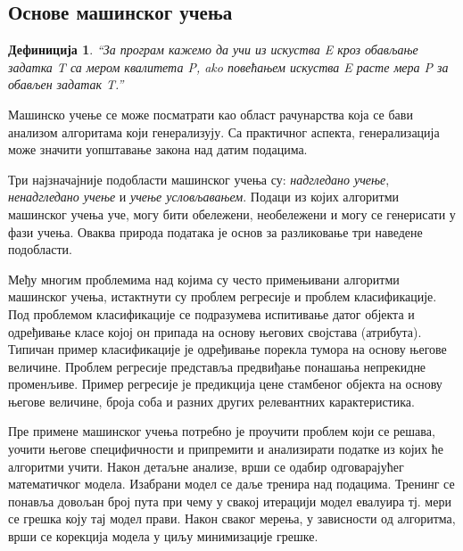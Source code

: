 \documentclass[a4paper]{article}
\newtheorem{definic}{Дефиниција}
\begin{document}
{\subsection{Основе машинског учења}
\begin{definic}
``За програм кажемо да учи из искуства E кроз обављање задатка T са мером квалитета P, ako повећањем искуства E расте мера P за обављен задатак T.''
\\[5pt]
\end{definic}


Машинско учење се може посматрати као област рачунарства која се бави анализом алгоритама који генерализују. Са практичног аспекта, генерализација може значити уопштавање закона над датим подацима.


Три најзначајније подобласти машинског учења су: \textit{надгледано учење}, \textit{ненадгледано учење} и \textit{учење условљавањем}. Подаци из којих алгоритми машинског учења уче, могу бити обележени, необележени и могу се генерисати у фази учења. Оваква природа података је основ за разликовање три наведене подобласти\cite{tom-ml}.


Међу многим проблемима над којима су често примењивани алгоритми машинског учења, истактнути су проблем регресије и проблем класификације. Под проблемом класификације се подразумева испитивање датог објекта и одређивање класе којој он припада на основу његових својстава (атрибута). Типичан пример класификације је одређивање порекла тумора на основу његове величине. Проблем регресије представља предвиђање понашања непрекидне променљиве. Пример регресије је предикција цене стамбеног објекта на основу његове величине, броја соба и разних других релевантних карактеристика.


Пре примене машинског учења потребно је проучити проблем који се решава, уочити његове специфичности и припремити и анализирати податке из којих ће алгоритми учити. Након детаљне анализе, врши се одабир одговарајућег математичког модела. Изабрани модел се даље тренира над подацима. Тренинг се понавља довољан број пута при чему у свакој итерацији модел евалуира тј. мери се грешка коју тај модел прави. Након сваког мерења, у зависности од алгоритма, врши се корекција модела у циљу минимизације грешке.
 


}
\end{document}
